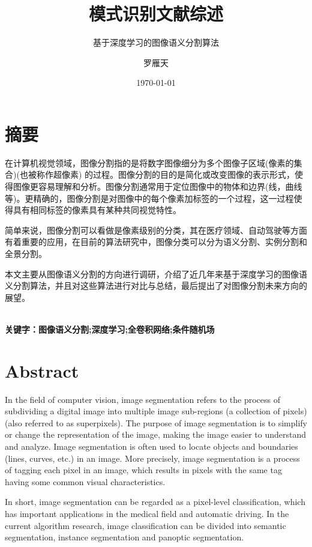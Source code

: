 \documentclass[cn]{elegantbook}
\title{模式识别文献综述}
\subtitle{基于深度学习的图像语义分割算法}
\author{罗雁天}
\institute{清华大学电子系}
\date{\today}
\begin{document}
\maketitle
\tableofcontents

\mainmatter
\hypersetup{pageanchor=true}
\chapter*{摘要}
在计算机视觉领域，图像分割指的是将数字图像细分为多个图像子区域(像素的集合)(也被称作超像素) 的过程。图像分割的目的是简化或改变图像的表示形式，使得图像更容易理解和分析。图像分割通常用于定位图像中的物体和边界(线，曲线等)。更精确的，图像分割是对图像中的每个像素加标签的一个过程，这一过程使得具有相同标签的像素具有某种共同视觉特性。

简单来说，图像分割可以看做是像素级别的分类，其在医疗领域、自动驾驶等方面有着重要的应用，在目前的算法研究中，图像分类可以分为语义分割、实例分割和全景分割。

本文主要从图像语义分割的方向进行调研，介绍了近几年来基于深度学习的图像语义分割算法，并且对这些算法进行对比与总结，最后提出了对图像分割未来方向的展望。

~\\

\noindent\textbf{关键字：图像语义分割;深度学习;全卷积网络;条件随机场}

\chapter*{Abstract}
In the field of computer vision, image segmentation refers to the process of subdividing a digital image into multiple image sub-regions (a collection of pixels) (also referred to as superpixels). The purpose of image segmentation is to simplify or change the representation of the image, making the image easier to understand and analyze. Image segmentation is often used to locate objects and boundaries (lines, curves, etc.) in an image. More precisely, image segmentation is a process of tagging each pixel in an image, which results in pixels with the same tag having some common visual characteristics.

In short, image segmentation can be regarded as a pixel-level classification, which has important applications in the medical field and automatic driving. In the current algorithm research, image classification can be divided into semantic segmentation, instance segmentation and panoptic segmentation.
\end{document}
